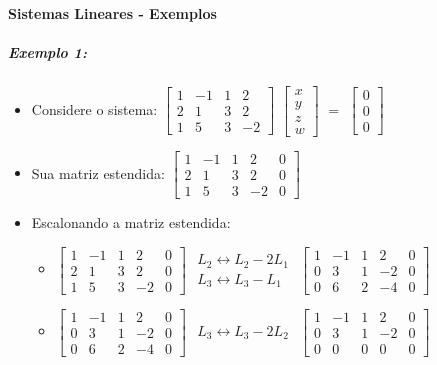 \documentclass[12pt]{article}
\begin{document}
\paragraph{Sistemas Lineares - Exemplos}

\subparagraph{Exemplo 1:}
	\begin{itemize}
	\item Considere o sistema:
	$\begin{bmatrix}
	1 & -1 & 1 & 2 \\ 2 & 1 & 3 & 2 \\ 1 & 5 & 3 & -2
	\end{bmatrix}$
	$\begin{bmatrix}
	x \\ y \\ z \\ w
	\end{bmatrix}$
	$ = $
	$\begin{bmatrix}
	0 \\ 0 \\ 0 
	\end{bmatrix}$
	\item Sua matriz estendida:
	$\begin{bmatrix}
	1 & -1 & 1 & 2 & 0\\ 2 & 1 & 3 & 2 & 0\\ 1 & 5 & 3 & -2 & 0
	\end{bmatrix}$
	
	\item Escalonando a matriz estendida:
		\begin{itemize}
		\item $\begin{bmatrix}
		1 & -1 & 1 & 2 & 0 \\ 2 & 1 & 3 & 2 & 0 \\ 1 & 5 & 3 & -2 & 0
		\end{bmatrix}$
		$\begin{matrix} L_2 \leftrightarrow L_2 - 2L_1 \\ L_3 \leftrightarrow L_3 - L_1 \end{matrix}$
		$\begin{bmatrix}
		1 & -1 & 1 & 2 & 0 \\ 0 & 3 & 1 & -2 & 0 \\ 0 & 6 & 2 & -4 & 0
		\end{bmatrix}$
		
		\item $\begin{bmatrix}
		1 & -1 & 1 & 2 & 0 \\ 0 & 3 & 1 & -2 & 0 \\ 0 & 6 & 2 & -4 & 0
		\end{bmatrix}$
		$\begin{matrix} L_3 \leftrightarrow L_3 - 2L_2 \end{matrix}$
		$\begin{bmatrix}
		1 & -1 & 1 & 2 & 0 \\ 0 & 3 & 1 & -2 & 0 \\ 0 & 0 & 0 & 0 & 0
		\end{bmatrix}$
		

\end{itemize}
\end{itemize}
\end{document}
